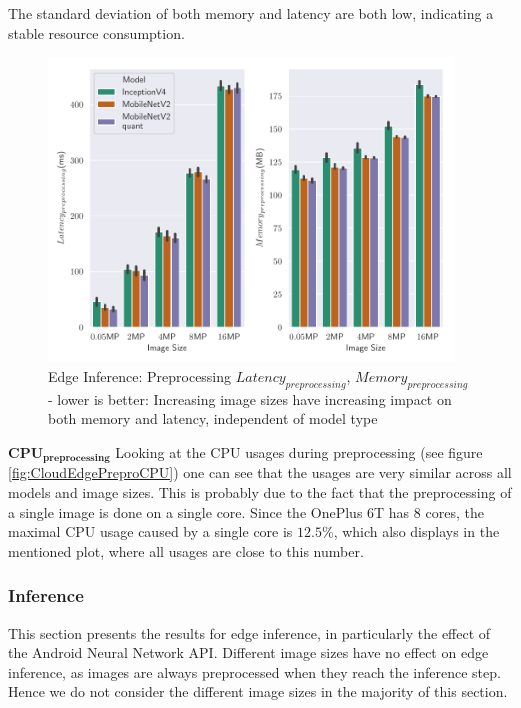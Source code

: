 The standard deviation of both memory and latency are both low, indicating a stable resource consumption.



\begin{figure}[!htb]
\centering
\includegraphics[width=0.96\textwidth]{./Bilder/single_plots/edge_inference_plots/Edge_Inference_Preprocessing.pdf}
\caption[Edge Inference: Preprocessing $Latency_{preprocessing}$, $Memory_{preprocessing}$]{Edge Inference: Preprocessing $Latency_{preprocessing}$, $Memory_{preprocessing}$ -  lower is better: Increasing image sizes have increasing impact on both memory and latency, independent of model type}
\label{fig:EdgePrepro}
\end{figure}
$\mathbf{CPU_{preprocessing}}$
Looking at the CPU usages during preprocessing (see figure \ref{fig:CloudEdgePreproCPU}) one can see that the usages are very similar across all models and image sizes. This is probably due to the fact that the preprocessing of a single image is done on a single core. Since the OnePlus 6T has $8$ cores, the maximal CPU usage caused by a single core is $12.5\%$, which also displays in the mentioned plot, where all usages are close to this number.

\FloatBarrier
\subsubsection{Inference}
This section presents the results for edge inference, in particularly the effect of the Android Neural Network API.
Different image sizes have no effect on edge inference, as images are always preprocessed when they reach the inference step.
Hence we do not consider the different image sizes in the majority of this section.


